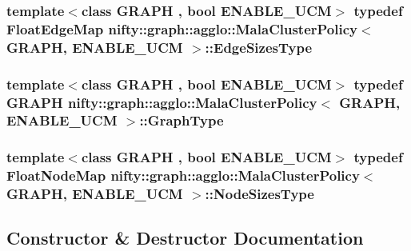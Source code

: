 \subsubsection[{Edge\+Sizes\+Type}]{\setlength{\rightskip}{0pt plus 5cm}template$<$class G\+R\+A\+P\+H , bool E\+N\+A\+B\+L\+E\+\_\+\+U\+C\+M$>$ typedef Float\+Edge\+Map {\bf nifty\+::graph\+::agglo\+::\+Mala\+Cluster\+Policy}$<$ G\+R\+A\+P\+H, E\+N\+A\+B\+L\+E\+\_\+\+U\+C\+M $>$\+::{\bf Edge\+Sizes\+Type}}\label{classnifty_1_1graph_1_1agglo_1_1MalaClusterPolicy_a33924545e782bd520270341b21599e7e}
\hypertarget{classnifty_1_1graph_1_1agglo_1_1MalaClusterPolicy_ae2696b85f3f04787282e003bead20a5d}{}
\subsubsection[{Graph\+Type}]{\setlength{\rightskip}{0pt plus 5cm}template$<$class G\+R\+A\+P\+H , bool E\+N\+A\+B\+L\+E\+\_\+\+U\+C\+M$>$ typedef G\+R\+A\+P\+H {\bf nifty\+::graph\+::agglo\+::\+Mala\+Cluster\+Policy}$<$ G\+R\+A\+P\+H, E\+N\+A\+B\+L\+E\+\_\+\+U\+C\+M $>$\+::{\bf Graph\+Type}}\label{classnifty_1_1graph_1_1agglo_1_1MalaClusterPolicy_ae2696b85f3f04787282e003bead20a5d}
\hypertarget{classnifty_1_1graph_1_1agglo_1_1MalaClusterPolicy_a559774b548ec31fb481a848a12a45abe}{}
\subsubsection[{Node\+Sizes\+Type}]{\setlength{\rightskip}{0pt plus 5cm}template$<$class G\+R\+A\+P\+H , bool E\+N\+A\+B\+L\+E\+\_\+\+U\+C\+M$>$ typedef Float\+Node\+Map {\bf nifty\+::graph\+::agglo\+::\+Mala\+Cluster\+Policy}$<$ G\+R\+A\+P\+H, E\+N\+A\+B\+L\+E\+\_\+\+U\+C\+M $>$\+::{\bf Node\+Sizes\+Type}}\label{classnifty_1_1graph_1_1agglo_1_1MalaClusterPolicy_a559774b548ec31fb481a848a12a45abe}


\subsection{Constructor \& Destructor Documentation}
\hypertarget{classnifty_1_1graph_1_1agglo_1_1MalaClusterPolicy_a2d238839c2d3afb3c0dac93ec5a00ceb}{}
